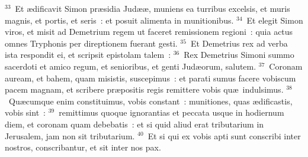 ${}^{33}$~Et \ae dificavit Simon pr\ae sidia Jud\ae \ae , muniens ea turribus excelsis, et muris magnis, et portis, et seris~: et posuit alimenta in munitionibus.
${}^{34}$~Et elegit Simon viros, et misit ad Demetrium regem ut faceret remissionem regioni~: quia actus omnes Tryphonis per direptionem fuerant gesti.
${}^{35}$~Et Demetrius rex ad verba ista respondit ei, et scripsit epistolam talem~:
${}^{36}$~Rex Demetrius Simoni summo sacerdoti et amico regum, et senioribus, et genti Jud\ae orum, salutem.
${}^{37}$~Coronam auream, et bahem, quam misistis, suscepimus~: et parati sumus facere vobiscum pacem magnam, et scribere pr\ae positis regis remittere vobis qu\ae\ indulsimus.
${}^{38}$~Qu\ae cumque enim constituimus, vobis constant~: munitiones, quas \ae dificastis, vobis sint~:
${}^{39}$~remittimus quoque ignorantias et peccata usque in hodiernum diem, et coronam quam debebatis~: et si quid aliud erat tributarium in Jerusalem, jam non sit tributarium.
${}^{40}$~Et si qui ex vobis apti sunt conscribi inter nostros, conscribantur, et sit inter nos pax.


